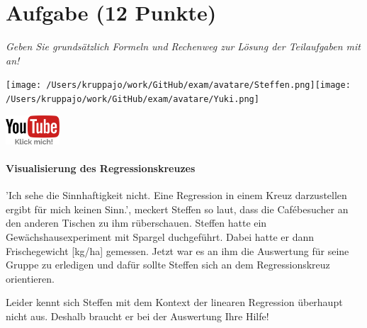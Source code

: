 \documentclass[a4paper, 9pt]{scrartcl}\usepackage[]{graphicx}\usepackage[]{xcolor}
\begin{document}
\section{Aufgabe \hfill (12 Punkte)}

\textit{Geben Sie grundsätzlich Formeln und Rechenweg zur Lösung der Teilaufgaben mit an!} \\[1Ex]
 

 
\ifcollection
\begin{flushright}
\tiny\vspace{-3Ex}
\textbf{\examinhaltstart}
\exammodulebiostat
\vspace{-4Ex}
\end{flushright}
\begin{minipage}[t]{0.5\textwidth}
\texttt{[image: /Users/kruppajo/work/GitHub/exam/avatare/Steffen.png]}\hspace{-4mm}\texttt{[image: /Users/kruppajo/work/GitHub/exam/avatare/Yuki.png]}
\end{minipage}
\begin{minipage}[t]{0.5\textwidth}
\hfill
\href{https://youtu.be/kHmfEmU6lrk}{\includegraphics[width = 2cm]{img/youtube}}
\end{minipage}
\fi



\ifcollection
\paragraph{Visualisierung des Regressionskreuzes}
\fi

'Ich sehe die Sinnhaftigkeit nicht. Eine Regression in einem Kreuz darzustellen ergibt für mich keinen Sinn.', meckert Steffen so laut, dass die Cafébesucher an den anderen Tischen zu ihm rüberschauen. Steffen hatte ein Gewächshausexperiment mit Spargel duchgeführt. Dabei hatte er dann Frischegewicht [kg/ha] gemessen. Jetzt war es an ihm die Auswertung für seine Gruppe zu erledigen und dafür sollte Steffen sich an dem Regressionskreuz orientieren.

\vspace{1Ex}

Leider kennt sich Steffen mit dem Kontext der linearen Regression überhaupt nicht aus. Deshalb braucht er bei der Auswertung Ihre Hilfe!
\end{document}
